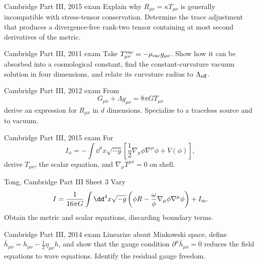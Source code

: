 \begin{exercises}

\begin{exercise}{Cambridge Part III, 2015 exam}
Explain why \(R_{\mu\nu}=\kappa T_{\mu\nu}\) is generally incompatible with
stress-tensor conservation.  Determine the trace adjustment that produces a
divergence-free rank-two tensor containing at most second derivatives of the
metric.
\end{exercise}

\begin{exercise}{Cambridge Part III, 2011 exam}
Take \(T_{\mu\nu}^{\rm vac}=-\rho_{\rm vac}g_{\mu\nu}\).  Show how it can be
absorbed into a cosmological constant, find the constant-curvature vacuum
solution in four dimensions, and relate its curvature radius to
\(\Lambda_{\rm eff}\).
\end{exercise}

\begin{exercise}{Cambridge Part III, 2012 exam}
From
\[
G_{\mu\nu}+\Lambda g_{\mu\nu}=8\pi G T_{\mu\nu}
\]
derive an expression for \(R_{\mu\nu}\) in \(d\) dimensions.  Specialize to a
traceless source and to vacuum.
\end{exercise}

\begin{exercise}{Cambridge Part III, 2015 exam}
For
\[
I_\phi=-\int\dd^4x\sqrt{-g}
\left[\frac12\nabla_\mu\phi\nabla^\mu\phi+V(\phi)\right],
\]
derive \(T_{\mu\nu}\), the scalar equation, and
\(\nabla_\mu T^{\mu\nu}=0\) on shell.
\end{exercise}

\begin{exercise}{Tong, Cambridge Part III Sheet 3}
Vary
\[
I=\frac1{16\pi G}\int\dd^4x\sqrt{-g}
\left(\phi R-\frac{\omega}{\phi}\nabla_\mu\phi\nabla^\mu\phi\right)
+I_{\rm m}.
\]
Obtain the metric and scalar equations, discarding boundary terms.
\end{exercise}

\begin{exercise}{Cambridge Part III, 2014 exam}
Linearize about Minkowski space, define
\(\bar h_{\mu\nu}=h_{\mu\nu}-\tfrac12\eta_{\mu\nu}h\), and show that the gauge
condition \(\partial^\mu\bar h_{\mu\nu}=0\) reduces the field equations to
wave equations.  Identify the residual gauge freedom.
\end{exercise}


\end{exercises}
